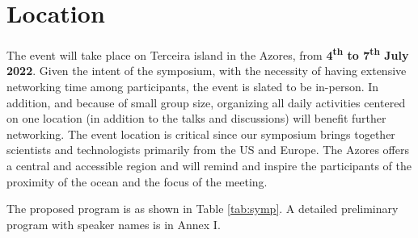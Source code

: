 \section{Location}

The event will take place on Terceira island in the Azores, from
\textbf{4\textsuperscript{th} to 7\textsuperscript{th} July
  2022}. Given the intent of the symposium, with the necessity of
having extensive networking time among participants, the event is
slated to be in-person. In addition, and because of small group size,
organizing all daily activities centered on one location (in addition
to the talks and discussions) will benefit further networking. The
event location is critical since our symposium brings together
scientists and technologists primarily from the US and Europe. The
Azores offers a central and accessible region and will remind and
inspire the participants of the proximity of the ocean and the focus
of the meeting.

\noindent
The proposed program is as shown in Table \ref{tab:symp}. A detailed
preliminary program with speaker names is in Annex I.

